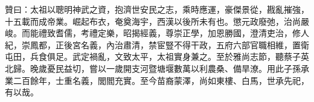 \begin{pinyinscope}
贊曰：太祖以聰明神武之資，抱濟世安民之志，乘時應運，豪傑景從，戡亂摧強，十五載而成帝業。崛起布衣，奄奠海宇，西漢以後所未有也。懲元政廢弛，治尚嚴峻。而能禮致耆儒，考禮定樂，昭揭經義，尊崇正學，加恩勝國，澄清吏治，修人紀，崇鳳都，正後宮名義，內治肅清，禁宦豎不得干政，五府六部官職相維，置衛屯田，兵食俱足。武定禍亂，文致太平，太祖實身兼之。至於雅尚志節，聽蔡子英北歸。晚歲憂民益切，嘗以一歲開支河暨塘堰數萬以利農桑、備旱潦。用此子孫承業二百餘年，士重名義，閭閻充實。至今苗裔蒙澤，尚如東樓、白馬，世承先祀，有以哉。


\end{pinyinscope}